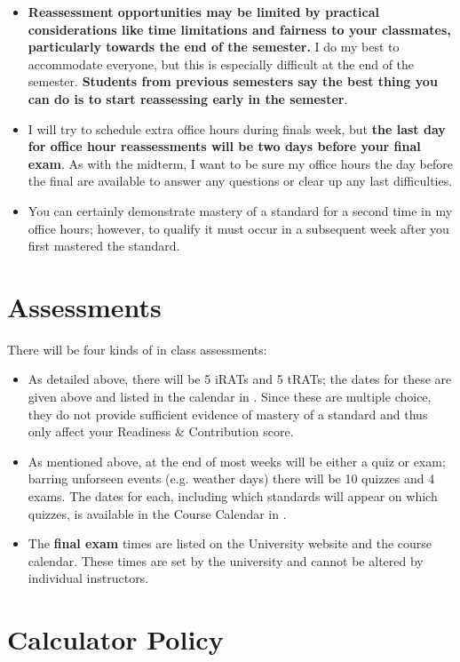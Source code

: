 \documentclass{article}
\begin{document}
\begin{enumerate}[1)]
\begin{itemize}
    \item \textbf{Reassessment opportunities may be limited by practical considerations like time limitations and fairness to your classmates, particularly towards the end of the semester.}  I do my best to accommodate everyone, but this is especially difficult at the end of the semester.  {\bf Students from previous semesters say the best thing you can do is to start reassessing early in the semester}.
    \item I will try to schedule extra office hours during finals week, but \textbf{the last day for office hour reassessments will be two days before your final exam}.  As with the midterm, I want to be sure my office hours the day before the final are available to answer any questions or clear up any last difficulties.
    \item You can certainly demonstrate mastery of a standard for a second time in my office hours; however, to qualify it must occur in a subsequent week after you first mastered the standard.
    \end{itemize}
    \end{enumerate}




\section*{\fontsize{12}{15}\selectfont Assessments}
There will be four kinds of in class assessments:
\begin{itemize}
\item As detailed above, there will be 5 iRATs and 5 tRATs; the dates for these are given above and listed in the calendar in \LMS.  Since these are multiple choice, they do not provide sufficient evidence of mastery of a standard and thus only affect your Readiness \& Contribution score.
\item As mentioned above, at the end of most weeks will be either a quiz or exam; barring unforseen events (e.g. weather days) there will be 10 quizzes and 4 exams.   The dates for each, including which standards will appear on which quizzes, is available in the Course Calendar in \LMS.
\item The {\bf final exam} times are listed on the University website and the course calendar. These times are set by the university and cannot be altered by individual instructors.
\end{itemize}

\section*{\fontsize{12}{15}\selectfont Calculator Policy}
\end{document}
